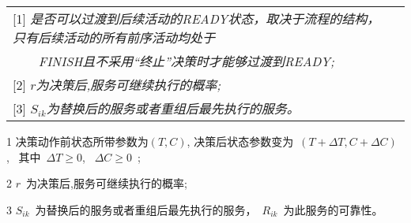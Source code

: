 \begin{table}[htbp]
\begin{threeparttable}
\begin{tabular}{llllllll}
            \multicolumn{7}{l}{[1] \textit{是否可以过渡到后续活动的READY状态，取决于流程的结构，只有后续活动的所有前序活动均处于}}  \\
            \multicolumn{7}{l}{\textit{~~~~FINISH且不采用“终止”决策时才能够过渡到READY;}} \\
            \multicolumn{7}{l}{[2] \textit{$r$为决策后,服务可继续执行的概率; }}  \\
            \multicolumn{7}{l}{[3] \textit{$S_{ik}$为替换后的服务或者重组后最先执行的服务。 }}  \\
        \end{tabular}%
    \begin{tablenotes}
        \item[1] 决策动作前状态所带参数为$(T,C)$, 决策后状态参数变为~$(T+\Delta T, C+\Delta C)$,~ 其中~$\Delta T \ge 0$, ~$\Delta C \ge 0$~; 
        \item[2] $r$~为决策后,服务可继续执行的概率;
        \item[3] $S_{ik}$~为替换后的服务或者重组后最先执行的服务，~$R_{ik}$~为此服务的可靠性。
    \end{tablenotes}
\end{threeparttable}
\end{table}%


